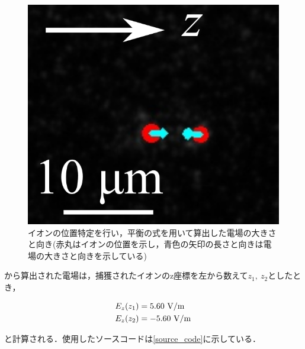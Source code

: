\begin{figure}[h]
	\begin{center}
		\includegraphics[scale=0.65]{./methods/figure/out_image.png}
		\caption{イオンの位置特定を行い，平衡の式を用いて算出した電場の大きさと向き(赤丸はイオンの位置を示し，青色の矢印の長さと向きは電場の大きさと向きを示している)}
		\label{fig:out_image}
	\end{center}
\end{figure}

から算出された電場は，捕獲されたイオンのz座標を左から数えて$z_{1}, \ z_{2}$としたとき，

\begin{align*}
	E_{z}(z_1) &= 5.60 \ {\rm V/m} \\
	E_{z}(z_2) &= -5.60 \ {\rm V/m} 
\end{align*}

と計算される．使用したソースコードは\ref{source_code}に示している．